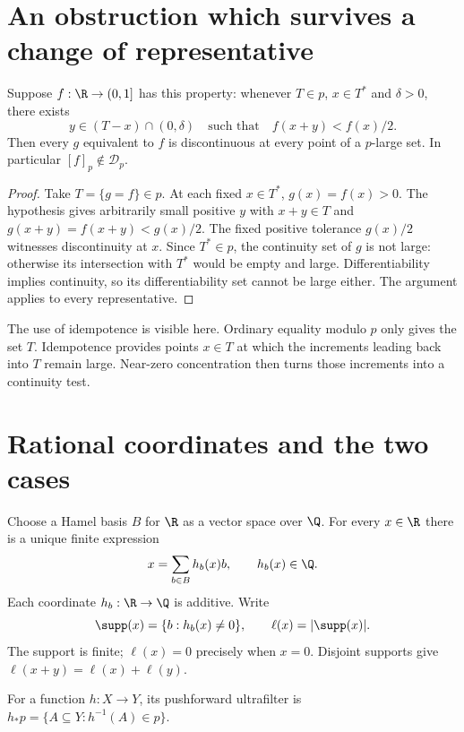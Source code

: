 \documentclass[11pt]{article}
\begin{document}
\section{An obstruction which survives a change of representative}

\begin{lemma}\label{lem:obstruction}
Suppose $f:\R\to(0,1]$ has this property: whenever $T\in p$, $x\in T^*$
and $\delta>0$, there exists
\[
 y\in (T-x)\cap(0,\delta)
 \quad\text{such that}\quad f(x+y)<f(x)/2.
\]
Then every $g$ equivalent to $f$ is discontinuous at every point of a
$p$-large set. In particular $[f]_p\notin\mathcal D_p$.
\end{lemma}
\begin{proof}
Take $T=\{g=f\}\in p$. At each fixed $x\in T^*$, $g(x)=f(x)>0$.
The hypothesis gives arbitrarily small positive $y$ with $x+y\in T$
and $g(x+y)=f(x+y)<g(x)/2$. The fixed positive tolerance $g(x)/2$
witnesses discontinuity at $x$. Since $T^*\in p$, the continuity set of
$g$ is not large: otherwise its intersection with $T^*$ would be empty
and large. Differentiability implies continuity, so its differentiability
set cannot be large either. The argument applies to every representative.
\end{proof}

The use of idempotence is visible here. Ordinary equality modulo $p$
only gives the set $T$. Idempotence provides points $x\in T$ at which
the increments leading back into $T$ remain large. Near-zero
concentration then turns those increments into a continuity test.

\section{Rational coordinates and the two cases}

Choose a Hamel basis $B$ for $\R$ as a vector space over $\Q$. For every
$x\in\R$ there is a unique finite expression
\[
 x=\sum_{b\in B}h_b(x)b,\qquad h_b(x)\in\Q.
\]
Each coordinate $h_b:\R\to\Q$ is additive. Write
\[
 \supp(x)=\{b:h_b(x)\ne0\},\qquad \ell(x)=|\supp(x)|.
\]
The support is finite; $\ell(x)=0$ precisely when $x=0$. Disjoint
supports give $\ell(x+y)=\ell(x)+\ell(y)$.

For a function $h:X\to Y$, its pushforward ultrafilter is
$h_*p=\{A\subseteq Y:h^{-1}(A)\in p\}$.
\end{document}
